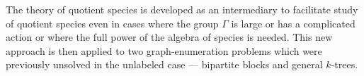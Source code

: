 \documentclass[sectionflow,singlespace,twoside]{brandiss} %
\numberwithin{section}{chapter}
\numberwithin{figure}{chapter}
\begin{document}

\frontmatter

\makedisstitle

\begin{comment}
  \begin{disssignatures}
    \committeemember Second Member, Dept.~of Mathematics
    \committeemember Third Member, Dept.~of Mathematics, Outside University
  \end{disssignatures}

  \disscopyright %

  \begin{dissdedication}
    A dedication is optional.
  \end{dissdedication}

  \begin{dissacknowledgments} %
    I wish to thank my advisor for her help and support.

    I am grateful to the members of my dissertation defense committee.
    
    I owe thanks to the faculty, to my fellow students, and to the kind
    and supportive staff of the Brandeis Mathematics Department.
  \end{dissacknowledgments}
\end{comment}

\begin{dissabstract}
  The theory of quotient species is developed as an intermediary to facilitate study of quotient species even in cases where the group $\Gamma$ is large or has a complicated action or where the full power of the algebra of species is needed.
  This new approach is then applied to two graph-enumeration problems which were previously unsolved in the unlabeled case --- bipartite blocks and general $k$-trees.
\end{dissabstract}

\begin{comment} We don't need a preface, at least for now.
  \begin{disspreface}
    A preface is optional.
  \end{disspreface}
\end{comment}
\end{document}
